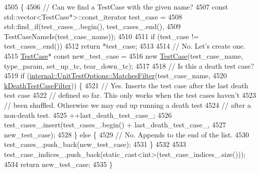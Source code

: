 \begin{DoxyCode}
4505                                                                            \{
4506   \textcolor{comment}{// Can we find a TestCase with the given name?}
4507   \textcolor{keyword}{const} std::vector<TestCase*>::const\_iterator test\_case =
4508       std::find\_if(test\_cases\_.begin(), test\_cases\_.end(),
4509                    TestCaseNameIs(test\_case\_name));
4510 
4511   \textcolor{keywordflow}{if} (test\_case != test\_cases\_.end())
4512     \textcolor{keywordflow}{return} *test\_case;
4513 
4514   \textcolor{comment}{// No.  Let's create one.}
4515   \hyperlink{namespacegmock__test__utils_a959c5af591e4d49b6d35745205b64509}{TestCase}* \textcolor{keyword}{const} new\_test\_case =
4516       \textcolor{keyword}{new} \hyperlink{namespacegmock__test__utils_a959c5af591e4d49b6d35745205b64509}{TestCase}(test\_case\_name, type\_param, set\_up\_tc, tear\_down\_tc);
4517 
4518   \textcolor{comment}{// Is this a death test case?}
4519   \textcolor{keywordflow}{if} (\hyperlink{classtesting_1_1internal_1_1UnitTestOptions_a67fc0adaffbb8d320b92e42e05017e4e}{internal::UnitTestOptions::MatchesFilter}(test\_case\_name,
4520                                                \hyperlink{namespacetesting_a23c33f4bfcc3c2e5e620eff31a98892d}{kDeathTestCaseFilter})) \{
4521     \textcolor{comment}{// Yes.  Inserts the test case after the last death test case}
4522     \textcolor{comment}{// defined so far.  This only works when the test cases haven't}
4523     \textcolor{comment}{// been shuffled.  Otherwise we may end up running a death test}
4524     \textcolor{comment}{// after a non-death test.}
4525     ++last\_death\_test\_case\_;
4526     test\_cases\_.insert(test\_cases\_.begin() + last\_death\_test\_case\_,
4527                        new\_test\_case);
4528   \} \textcolor{keywordflow}{else} \{
4529     \textcolor{comment}{// No.  Appends to the end of the list.}
4530     test\_cases\_.push\_back(new\_test\_case);
4531   \}
4532 
4533   test\_case\_indices\_.push\_back(static\_cast<int>(test\_case\_indices\_.size()));
4534   \textcolor{keywordflow}{return} new\_test\_case;
4535 \}
\end{DoxyCode}
